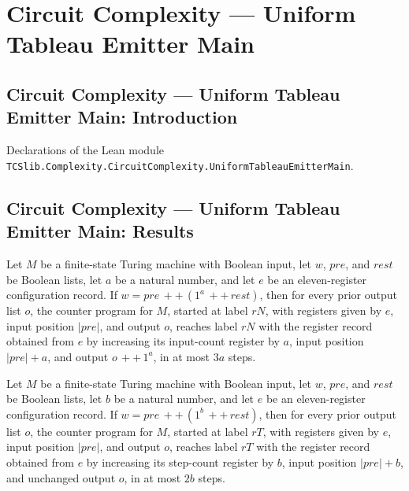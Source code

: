 \section{Circuit Complexity --- Uniform Tableau Emitter Main}
\subsection*{Circuit Complexity --- Uniform Tableau Emitter Main: Introduction}

Declarations of the Lean module \texttt{TCSlib.Complexity.CircuitComplexity.UniformTableauEmitterMain}.

\subsection*{Circuit Complexity --- Uniform Tableau Emitter Main: Results}

\begin{theorem}
\label{Complexity.UTab.goes_rN}
\leanok
{}
Let $M$ be a finite-state Turing machine with Boolean input, let $w$, $pre$, and $rest$
be Boolean lists, let $a$ be a natural number, and let $e$ be an eleven-register
configuration record. If $w = pre \, ++ \, (1^a \, ++ \, rest)$, then for every prior
output list $o$, the counter program for $M$, started at label $rN$, with registers
given by $e$, input position $|pre|$, and output $o$, reaches label $rN$ with the
register record obtained from $e$ by increasing its input-count register by $a$, input
position $|pre|+a$, and output $o \, ++ \, 1^a$, in at most $3a$ steps.
\end{theorem}

\begin{theorem}
\label{Complexity.UTab.goes_rT}
\leanok
{}
Let $M$ be a finite-state Turing machine with Boolean input, let $w$, $pre$, and $rest$
be Boolean lists, let $b$ be a natural number, and let $e$ be an eleven-register
configuration record. If $w = pre \, ++ \, (1^b \, ++ \, rest)$, then for every prior
output list $o$, the counter program for $M$, started at label $rT$, with registers
given by $e$, input position $|pre|$, and output $o$, reaches label $rT$ with the
register record obtained from $e$ by increasing its step-count register by $b$, input
position $|pre|+b$, and unchanged output $o$, in at most $2b$ steps.
\end{theorem}

